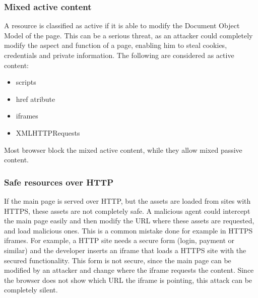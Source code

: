 \subsubsection{Mixed active content}
A resource is classified as active if it is able to modify the Document Object Model of the page. This can be a serious threat, as an attacker could completely modify the aspect and function of a page, enabling him to steal cookies, credentials and private information. The following are considered as active content:

\begin{itemize}
\item scripts
\item href atribute
\item iframes
\item XMLHTTPRequests
\end{itemize}

Most browser block the mixed active content, while they allow mixed passive content.

\subsubsection{Safe resources over HTTP}
If the main page is served over HTTP, but the assets are loaded from sites with HTTPS, these assets are not completely safe. A malicious agent could intercept the main page easily and then modify the URL where these assets are requested, and load malicious ones. This is a common mistake done for example in HTTPS iframes. For example, a HTTP site needs a secure form (login, payment or similar) and the developer inserts an iframe that loads a HTTPS site with the secured functionality. This form is not secure, since the main page can be modified by an attacker and change where the iframe requests the content. Since the browser does not show which URL the iframe is pointing, this attack can be completely silent.


